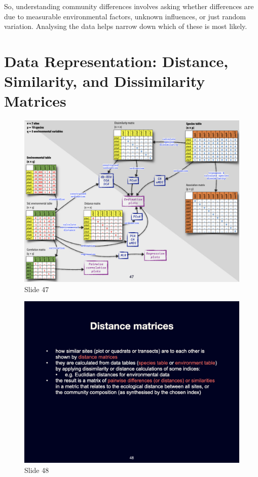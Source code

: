 \documentclass[
  12pt,
]{book}
\begin{document}
So, understanding community differences involves asking whether
differences are due to measurable environmental factors, unknown
influences, or just random variation. Analysing the data helps narrow
down which of these is most likely.

\section{Data Representation: Distance, Similarity, and Dissimilarity
Matrices}\label{data-representation-distance-similarity-and-dissimilarity-matrices}

\begin{figure}[ht]
\centering
\includegraphics[width=0.8\linewidth]{../images/BDC334/BDC334-047.jpeg}
\caption*{Slide 47}
\end{figure}

\begin{figure}[ht]
\centering
\includegraphics[width=0.8\linewidth]{../images/BDC334/BDC334-048.jpeg}
\caption*{Slide 48}
\end{figure}
\end{document}
